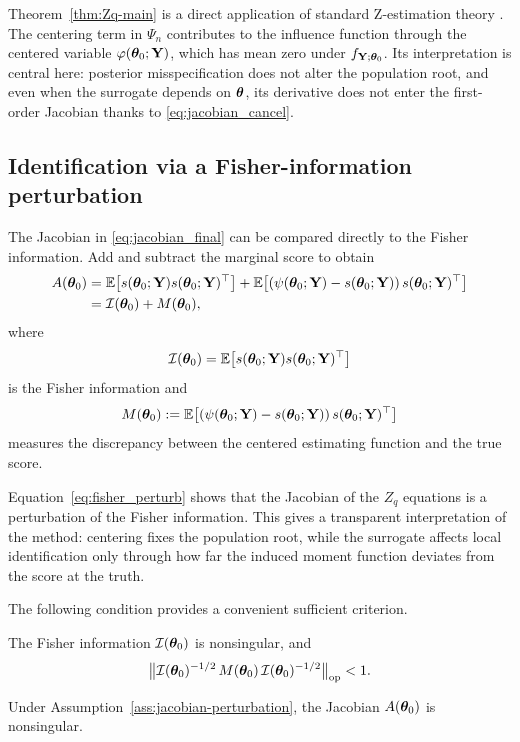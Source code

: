 \documentclass[twoside,11pt]{article}
\begin{document}
Theorem~\ref{thm:Zq-main} is a direct application of standard Z-estimation
theory \citep[Theorems 5.9 and 5.41]{vandervaart1998}. The centering term in
$\Psi_n$ contributes to the influence function through the centered variable
$\varphi({\bm{\theta}}_0;{\bf Y})$, which has mean zero under $f_{{\bf Y};{\bm{\theta}}_0}$. Its interpretation
is central here: posterior misspecification does not alter the population root,
and even when the surrogate depends on ${\bm{\theta}}$, its derivative does not enter the
first-order Jacobian thanks to \eqref{eq:jacobian_cancel}.

\subsection{Identification via a Fisher-information perturbation}

The Jacobian in \eqref{eq:jacobian_final} can be compared directly to the Fisher
information. Add and subtract the marginal score to obtain
\begin{align}
A({\bm{\theta}}_0)
&=
\mathbb E\!\left[s({\bm{\theta}}_0;{\bf Y})s({\bm{\theta}}_0;{\bf Y})^\top\right]
+
\mathbb E\!\left[(\psi({\bm{\theta}}_0;{\bf Y})-s({\bm{\theta}}_0;{\bf Y}))\,s({\bm{\theta}}_0;{\bf Y})^\top\right]
\nonumber\\
&=
\mathcal I({\bm{\theta}}_0)+M({\bm{\theta}}_0),
\label{eq:fisher_perturb}
\end{align}
where
\[
\mathcal I({\bm{\theta}}_0)
=
\mathbb E\!\left[s({\bm{\theta}}_0;{\bf Y})s({\bm{\theta}}_0;{\bf Y})^\top\right]
\]
is the Fisher information and
\[
M({\bm{\theta}}_0)
:=
\mathbb E\!\left[(\psi({\bm{\theta}}_0;{\bf Y})-s({\bm{\theta}}_0;{\bf Y}))\,s({\bm{\theta}}_0;{\bf Y})^\top\right]
\]
measures the discrepancy between the centered estimating function and the true
score.

Equation~\eqref{eq:fisher_perturb} shows that the Jacobian of the $Z_q$
equations is a perturbation of the Fisher information. This gives a transparent
interpretation of the method: centering fixes the population root, while the
surrogate affects local identification only through how far the induced moment
function deviates from the score at the truth.

The following condition provides a convenient sufficient criterion.

\begin{assumption}
\label{ass:jacobian-perturbation}
The Fisher information $\mathcal I({\bm{\theta}}_0)$ is nonsingular, and
\[
\bigl\|
\mathcal I({\bm{\theta}}_0)^{-1/2}
\,M({\bm{\theta}}_0)\,
\mathcal I({\bm{\theta}}_0)^{-1/2}
\bigr\|_{\mathrm{op}}
<1.
\]
\end{assumption}

\begin{proposition}
\label{prop:jacobian-neumann}
Under Assumption~\ref{ass:jacobian-perturbation}, the Jacobian $A({\bm{\theta}}_0)$ is
nonsingular.
\end{proposition}
\end{document}
